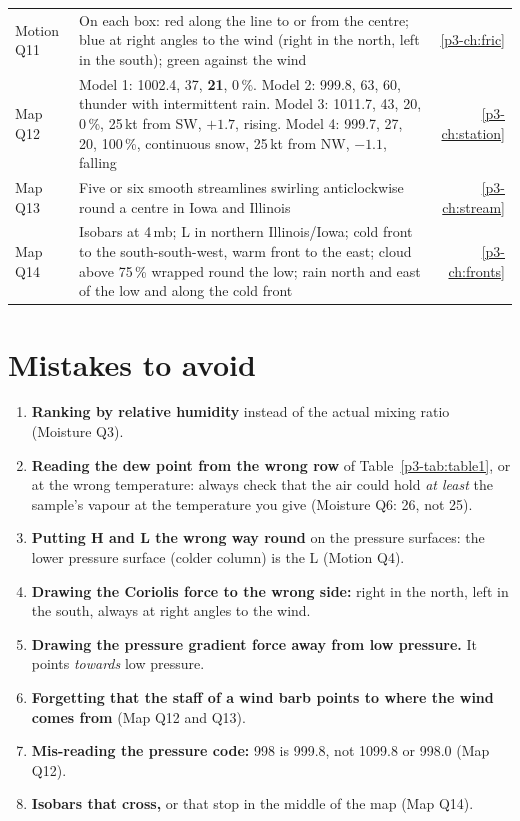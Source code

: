 \begin{table}[ht]
\begin{tabularx}{\textwidth}{@{}lXr@{}}
Motion Q11 & On each box: red along the line to or from the centre; blue at right angles to the wind (right in the north, left in the south); green against the wind & \ref{p3-ch:fric}\\
Map Q12 & Model 1: 1002.4, 37, \textbf{21}, 0\,\%. Model 2: 999.8, 63, 60, thunder with intermittent rain. Model 3: 1011.7, 43, 20, 0\,\%, 25\,kt from SW, $+1.7$, rising. Model 4: 999.7, 27, 20, 100\,\%, continuous snow, 25\,kt from NW, $-1.1$, falling & \ref{p3-ch:station}\\
Map Q13 & Five or six smooth streamlines swirling anticlockwise round a centre in Iowa and Illinois & \ref{p3-ch:stream}\\
Map Q14 & Isobars at 4\,mb; L in northern Illinois/Iowa; cold front to the south-south-west, warm front to the east; cloud above 75\,\% wrapped round the low; rain north and east of the low and along the cold front & \ref{p3-ch:fronts}\\
\bottomrule
\end{tabularx}
\end{table}

\section{Mistakes to avoid}\label{p3-sec:mistakes}

\begin{enumerate}[label=\textbf{\arabic*.},itemsep=3pt]
\item \textbf{Ranking by relative humidity} instead of the actual mixing ratio (Moisture Q3).
\item \textbf{Reading the dew point from the wrong row} of Table~\ref{p3-tab:table1}, or at the wrong temperature: always check that the air could hold \emph{at least} the sample's vapour at the temperature you give (Moisture Q6: 26, not 25).
\item \textbf{Putting H and L the wrong way round} on the pressure surfaces: the lower pressure surface (colder column) is the L (Motion Q4).
\item \textbf{Drawing the Coriolis force to the wrong side:} right in the north, left in the south, always at right angles to the wind.
\item \textbf{Drawing the pressure gradient force away from low pressure.} It points \emph{towards} low pressure.
\item \textbf{Forgetting that the staff of a wind barb points to where the wind comes from} (Map Q12 and Q13).
\item \textbf{Mis-reading the pressure code:} 998 is 999.8, not 1099.8 or 998.0 (Map Q12).
\item \textbf{Isobars that cross,} or that stop in the middle of the map (Map Q14).
\end{enumerate}

